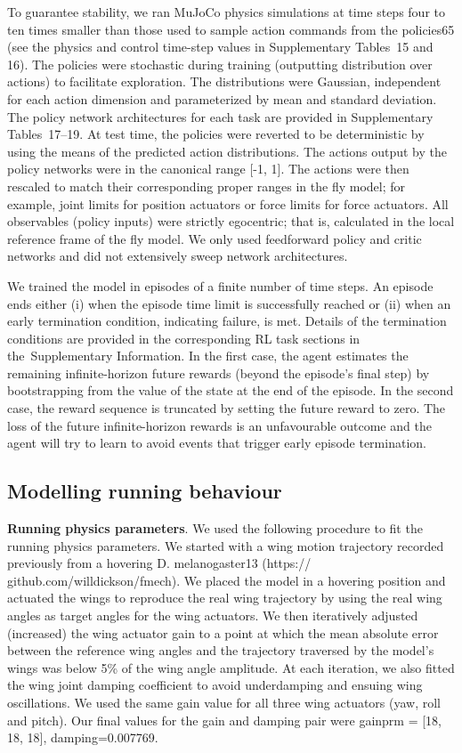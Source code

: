 \documentclass[sn-mathphys-num]{sn-jnl}%
\theoremstyle{thmstyleone}%
\theoremstyle{thmstyletwo}%
\theoremstyle{thmstylethree}%
\begin{document}
To guarantee stability, we ran MuJoCo physics simulations at time steps four to ten times smaller than those used to sample action commands from the policies65 (see the physics and control time-step values in Supplementary Tables 15 and 16). 
The policies were stochastic during training (outputting distribution over actions) to facilitate exploration. 
The distributions were Gaussian, independent for each action dimension and parameterized by mean and standard deviation. 
The policy network architectures for each task are provided in Supplementary Tables 17–19. 
At test time, the policies were reverted to be deterministic by using the means of the predicted action distributions. 
The actions output by the policy networks were in the canonical range [-1, 1].
The actions were then rescaled to match their corresponding proper ranges in the fly model; 
for example, joint limits for position actuators or force limits for force actuators. 
All observables (policy inputs) were strictly egocentric; 
that is, calculated in the local reference frame of the fly model. 
We only used feedforward policy and critic networks and did not extensively sweep network architectures.


We trained the model in episodes of a finite number of time steps. 
An episode ends either (i) when the episode time limit is successfully reached or (ii) when an early termination condition, indicating failure, is met. 
Details of the termination conditions are provided in the corresponding RL task sections in the Supplementary Information. 
In the first case, the agent estimates the remaining infinite-horizon future rewards (beyond the episode’s final step) by bootstrapping from the value of the state at the end of the episode. 
In the second case, the reward sequence is truncated by setting the future reward to zero. 
The loss of the future infinite-horizon rewards is an unfavourable outcome and the agent will try to learn to avoid events that trigger early episode termination.


\subsection{Modelling running behaviour}

\textbf{Running physics parameters}. 
We used the following procedure to fit the running physics parameters. 
We started with a wing motion trajectory recorded previously from a hovering D. melanogaster13 (https:// github.com/willdickson/fmech). 
We placed the model in a hovering position and actuated the wings to reproduce the real wing trajectory by using the real wing angles as target angles for the wing actuators. 
We then iteratively adjusted (increased) the wing actuator gain to a point at which the mean absolute error between the reference wing angles and the trajectory traversed by the model’s wings was below 5\% of the wing angle amplitude. 
At each iteration, we also fitted the wing joint damping coefficient to avoid underdamping and ensuing wing oscillations. 
We used the same gain value for all three wing actuators (yaw, roll and pitch).
Our final values for the gain and damping pair were gainprm = [18, 18, 18], damping=0.007769. 
\end{document}

